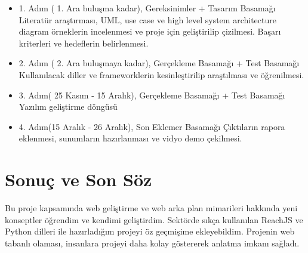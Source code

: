 \begin{itemize}
  \item 1. Adım ( 1. Ara buluşma kadar), Gereksinimler + Tasarım Basamağı
  \newline
Literatür araştırması, UML, use case ve high level system architecture diagram örneklerin incelenmesi ve proje için geliştirilip çizilmesi. Başarı kriterleri ve hedeflerin belirlenmesi.
  \item 2. Adım ( 2. Ara buluşmaya kadar), Gerçekleme Basamağı + Test Basamağı
  \newline
Kullanılacak diller ve frameworklerin kesinleştirilip araştılması ve öğrenilmesi.
  \item 3. Adım( 25 Kasım - 15 Aralık), Gerçekleme Basamağı + Test Basamağı
  \newline
Yazılım geliştirme döngüsü
  \item 4. Adım(15 Aralık - 26 Aralık), Son Eklemer Basamağı
  \newline
Çıktıların rapora eklenmesi, sunumların hazırlanması ve vidyo demo çekilmesi.
\end{itemize}
\section{Sonuç ve Son Söz}
Bu proje kapsamında web geliştirme ve web arka plan mimarileri hakkında yeni konseptler öğrendim ve kendimi geliştirdim. Sektörde sıkça kullanılan ReachJS ve Python dilleri ile hazırladığım projeyi öz geçmişime ekleyebildim. Projenin web tabanlı olaması, insanlara projeyi daha kolay göstererek anlatma imkanı sağladı.

